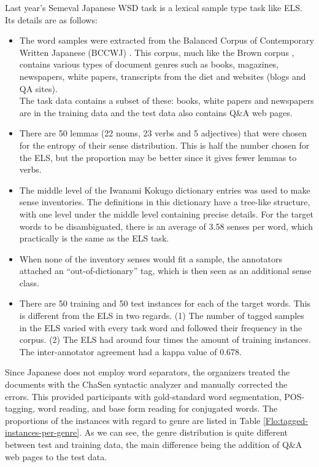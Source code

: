 \documentclass[english]{jnlp_1.4}
\begin{document}
Last year's Semeval Japanese WSD task \cite{Semeval2010JWSD} is a
lexical sample type task like ELS. Its details are as follows:
\begin{itemize}
\item The word samples were extracted from the Balanced Corpus of Contemporary
Written Japanese (BCCWJ) \cite{BccwjCorpus}. This corpus, much like
the Brown corpus \cite{BrownCorpus}, contains various types of document
genres such as books, magazines, newspapers, white papers, transcripts
from the diet and websites (blogs and QA sites).\\
The task data contains a subset of these: books, white papers and
newspapers are in the training data and the test data also contains
Q\&A web pages.
\item There are 50 lemmas (22 nouns, 23 verbs and 5 adjectives) that were
chosen for the entropy of their sense distribution. This is half the
number chosen for the ELS, but the proportion may be better since
it gives fewer lemmas to verbs.
\item The middle level of the Iwanami Kokugo dictionary entries was used
to make sense inventories. The definitions in this dictionary have
a tree-like structure, with one level under the middle level containing
precise details. For the target words to be disambiguated, there is
an average of 3.58 senses per word, which practically is the same
as the ELS task.
\item When none of the inventory senses would fit a sample, the annotators
attached an {}``out-of-dictionary'' tag, which is then seen as an
additional sense class. 
\item There are 50 training and 50 test instances for each of the target
words. This is different from the ELS in two regards. (1) The number
of tagged samples in the ELS varied with every task word and followed
their frequency in the corpus. (2) The ELS had around four times the
amount of training instances. The inter-annotator agreement had a
kappa value of 0.678.
\end{itemize}
Since Japanese does not employ word separators, the organizers treated
the documents with the ChaSen syntactic analyzer and manually corrected
the errors. This provided participants with gold-standard word segmentation,
POS-tagging, word reading, and base form reading for conjugated words.
The proportions of the instances with regard to genre are listed in
Table \ref{Flo:tagged-instances-per-genre}. As we can see, the genre
distribution is quite different between test and training data, the
main difference being the addition of Q\&A web pages to the test data.
\end{document}
